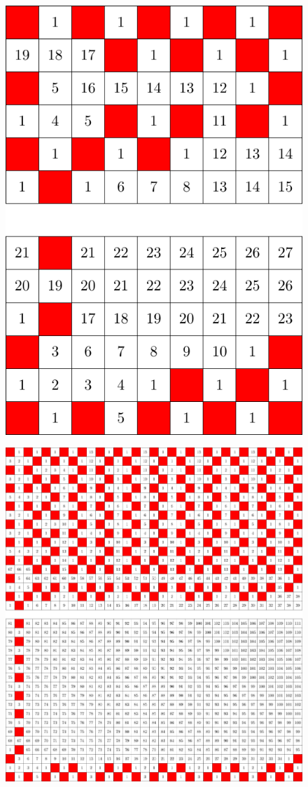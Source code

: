 \begin{figure}[]
\centering
\includegraphics[width=\textwidth]{figures/4/6x9x2_numbered_heatmap.pdf}
\caption{}
\label{fig:6x9x2}
\end{figure} 

\begin{figure}[]
\centering
\includegraphics[width=\textwidth]{figures/4/18x33x2_numbered_heatmap.pdf}
\caption{}
\label{fig:6x9x2}
\end{figure} 

